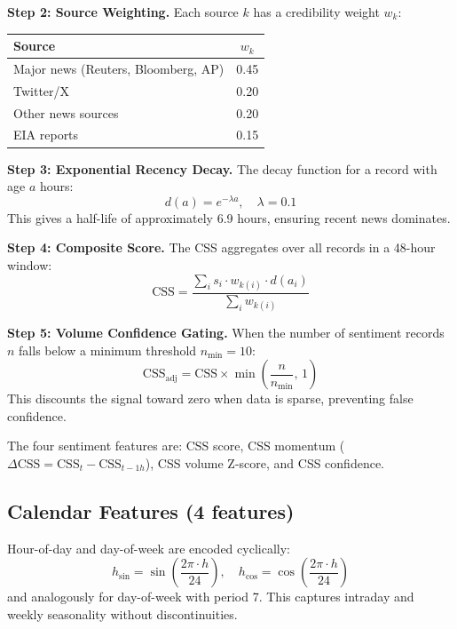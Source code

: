 \documentclass[12pt,a4paper]{article}
\begin{document}
\textbf{Step 2: Source Weighting.} Each source $k$ has a credibility weight $w_k$:
\begin{center}
\begin{tabular}{lc}
\toprule
Source & $w_k$ \\
\midrule
Major news (Reuters, Bloomberg, AP) & 0.45 \\
Twitter/X & 0.20 \\
Other news sources & 0.20 \\
EIA reports & 0.15 \\
\bottomrule
\end{tabular}
\end{center}

\textbf{Step 3: Exponential Recency Decay.} The decay function for a record with age $a$ hours:
\begin{equation}
    d(a) = e^{-\lambda a}, \quad \lambda = 0.1
\end{equation}
This gives a half-life of approximately 6.9 hours, ensuring recent news dominates.

\textbf{Step 4: Composite Score.} The CSS aggregates over all records in a 48-hour window:
\begin{equation}
    \text{CSS} = \frac{\sum_{i} s_i \cdot w_{k(i)} \cdot d(a_i)}{\sum_{i} w_{k(i)}}
    \label{eq:css}
\end{equation}

\textbf{Step 5: Volume Confidence Gating.} When the number of sentiment records $n$ falls below a minimum threshold $n_{\min} = 10$:
\begin{equation}
    \text{CSS}_{\text{adj}} = \text{CSS} \times \min\!\left(\frac{n}{n_{\min}},\, 1\right)
\end{equation}
This discounts the signal toward zero when data is sparse, preventing false confidence.

The four sentiment features are: CSS score, CSS momentum ($\Delta\text{CSS} = \text{CSS}_t - \text{CSS}_{t-1h}$), CSS volume Z-score, and CSS confidence.

\subsection{Calendar Features (4 features)}

Hour-of-day and day-of-week are encoded cyclically:
\begin{equation}
    h_{\sin} = \sin\!\left(\frac{2\pi \cdot h}{24}\right), \quad
    h_{\cos} = \cos\!\left(\frac{2\pi \cdot h}{24}\right)
\end{equation}
and analogously for day-of-week with period 7. This captures intraday and weekly seasonality without discontinuities.
\end{document}
